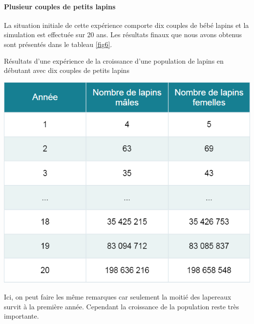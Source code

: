 \documentclass[12pt]{article}
\begin{document}
    \paragraph{Plusieur couples de petits lapins}\hspace{0.5cm}
    \newline
    \par La situation initiale de cette expérience comporte dix couples de bébé lapins et la simulation est effectuée sur 20 ans. Les résultats finaux que nous avons obtenus sont présentés dans le tableau \ref{fig6}.
    \begin{table}[!h]
	    \centering
	    \caption{Résultats d'une expérience de la croissance d'une population de lapins en débutant avec dix couples de petits lapins}
        \includegraphics[scale = 0.8]{Photos/lapins10p.png}
	    \label{fig6}
	\end{table}
    \par
    Ici, on peut faire les même remarques car seulement la moitié des lapereaux survit à la première année. Cependant la croissance de la population reste très importante.
\end{document}
